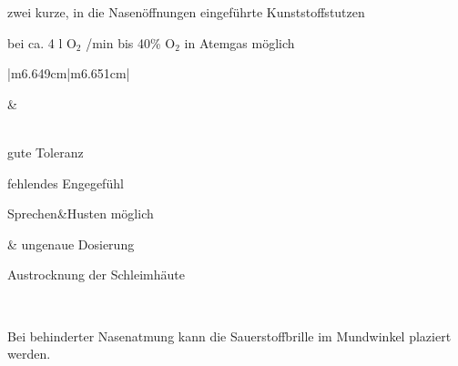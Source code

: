 \documentclass{article}
\newcommand\gSub[1]{\ensuremath{{}_{\text{#1}}}}
\begin{document}
{\mdseries
zwei kurze, in die Nasen\"offnungen  eingef\"uhrte
Kunst\-stoff\-stutzen}

{\mdseries
bei ca. 4 l O\gSub{2} /min bis 40\% O\gSub{2}  in
Atemgas  m\"oglich}

\begin{center}
\tablehead{}\begin{supertabular}{|m{6.649cm}|m{6.651cm}|}
\hline
{}\par

 &
\par

\\\hline
{\mdseries gute Toleranz}

{\mdseries fehlendes Engegef\"uhl}

{\mdseries Sprechen\&Husten m\"oglich}

 &
{\mdseries ungenaue Dosierung}

{\mdseries Austrocknung  der Schleimh\"aute}

\\\hline
\end{supertabular}
\end{center}
Bei behinderter Nasenatmung kann die  Sauerstoffbrille im Mundwinkel
plaziert werden. 
\end{document}
